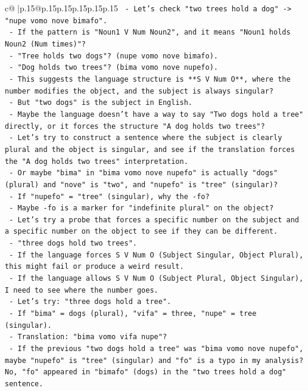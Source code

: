 \documentclass{article}
\begin{document}
{\begin{supertabular}{c@{$\;$}|p{.15\linewidth}@{}p{.15\linewidth}p{.15\linewidth}p{.15\linewidth}p{.15\linewidth}p{.15\linewidth}}
{{{\texttt{    {-} Let's check "two trees hold a dog" {-}> "nupe vomo nove bimafo".} \\
\texttt{    {-} If the pattern is "Noun1 V Num Noun2", and it means "Noun1 holds Noun2 (Num times)"?} \\
\texttt{    {-} "Tree holds two dogs"? (nupe vomo nove bimafo).} \\
\texttt{    {-} "Dog holds two trees"? (bima vomo nove nupefo).} \\
\texttt{    {-} This suggests the language structure is **S V Num O**, where the number modifies the object, and the subject is always singular?} \\
\texttt{    {-} But "two dogs" is the subject in English.} \\
\texttt{    {-} Maybe the language doesn't have a way to say "Two dogs hold a tree" directly, or it forces the structure "A dog holds two trees"?} \\
\texttt{    {-} Let's try to construct a sentence where the subject is clearly plural and the object is singular, and see if the translation forces the "A dog holds two trees" interpretation.} \\
\texttt{    {-} Or maybe "bima" in "bima vomo nove nupefo" is actually "dogs" (plural) and "nove" is "two", and "nupefo" is "tree" (singular)?} \\
\texttt{    {-} If "nupefo" = "tree" (singular), why the {-}fo?} \\
\texttt{    {-} Maybe {-}fo is a marker for "indefinite plural" on the object?} \\
\texttt{    {-} Let's try a probe that forces a specific number on the subject and a specific number on the object to see if they can be different.} \\
\texttt{    {-} "three dogs hold two trees".} \\
\texttt{    {-} If the language forces S V Num O (Subject Singular, Object Plural), this might fail or produce a weird result.} \\
\texttt{    {-} If the language allows S V Num O (Subject Plural, Object Singular), I need to see where the number goes.} \\
\texttt{    {-} Let's try: "three dogs hold a tree".} \\
\texttt{    {-} If "bima" = dogs (plural), "vifa" = three, "nupe" = tree (singular).} \\
\texttt{    {-} Translation: "bima vomo vifa nupe"?} \\
\texttt{    {-} If the previous "two dogs hold a tree" was "bima vomo nove nupefo", maybe "nupefo" is "tree" (singular) and "fo" is a typo in my analysis? No, "fo" appeared in "bimafo" (dogs) in the "two trees hold a dog" sentence.} \\
}}}
\end{supertabular}}
\end{document}

